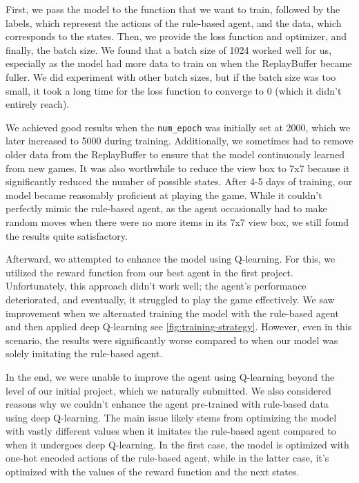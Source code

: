 First, we pass the model to the function that we want to train, followed by the labels, 
which represent the actions of the rule-based agent, and the data, which corresponds to the states. 
Then, we provide the loss function and optimizer, and finally, the batch size. We found that a batch size of 1024 worked well for us, 
especially as the model had more data to train on when the ReplayBuffer became fuller. We did experiment with other batch sizes,
but if the batch size was too small, it took a long time for the loss function to converge to 0 (which it didn't entirely reach).

We achieved good results when the \verb|num_epoch| was initially set at 2000, which we later increased to 5000 during training. 
Additionally, we sometimes had to remove older data from the ReplayBuffer to ensure that the model continuously learned from new games. 
It was also worthwhile to reduce the view box to 7x7 because it significantly reduced the number of possible states. 
After 4-5 days of training, our model became reasonably proficient at playing the game. While it couldn't perfectly mimic the rule-based agent, 
as the agent occasionally had to make random moves when there were no more items in its 7x7 view box, we still found the results quite satisfactory.

Afterward, we attempted to enhance the model using Q-learning. For this, we utilized the reward function from our best agent in the first project. 
Unfortunately, this approach didn't work well; the agent's performance deteriorated, and eventually, it struggled to play the game effectively. 
We saw improvement when we alternated training the model with the rule-based agent and then applied deep Q-learning see \autoref{fig:training-strategy}. 
However, even in this scenario, 
the results were significantly worse compared to when our model was solely imitating the rule-based agent.

In the end, we were unable to improve the agent using Q-learning beyond the level of our initial project, 
which we naturally submitted. We also considered reasons why we couldn't enhance the agent pre-trained with rule-based 
data using deep Q-learning. The main issue likely stems from optimizing the model with vastly different values when it imitates 
the rule-based agent compared to when it undergoes deep Q-learning. In the first case, the model is optimized with one-hot encoded 
actions of the rule-based agent, while in the latter case, it's optimized with the values of the reward function and the next states.